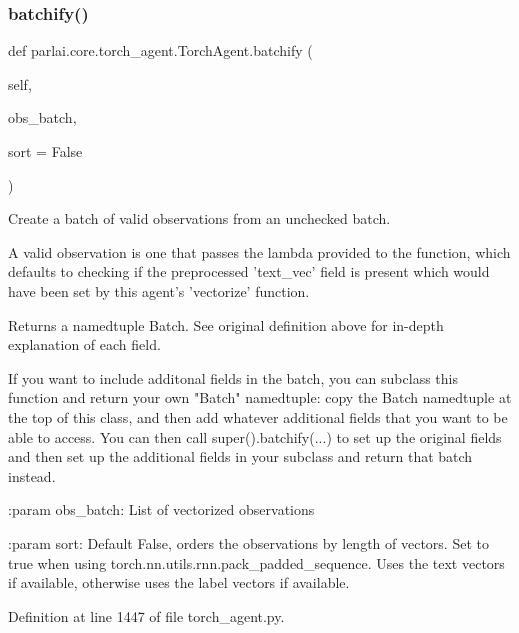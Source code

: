 \subsubsection{\texorpdfstring{batchify()}{batchify()}}
{\footnotesize\ttfamily def parlai.\+core.\+torch\+\_\+agent.\+Torch\+Agent.\+batchify (\begin{DoxyParamCaption}\item[{}]{self,  }\item[{}]{obs\+\_\+batch,  }\item[{}]{sort = {\ttfamily False} }\end{DoxyParamCaption})}

\begin{DoxyVerb}Create a batch of valid observations from an unchecked batch.

A valid observation is one that passes the lambda provided to the
function, which defaults to checking if the preprocessed 'text_vec'
field is present which would have been set by this agent's 'vectorize'
function.

Returns a namedtuple Batch. See original definition above for in-depth
explanation of each field.

If you want to include additonal fields in the batch, you can subclass
this function and return your own "Batch" namedtuple: copy the Batch
namedtuple at the top of this class, and then add whatever additional
fields that you want to be able to access. You can then call
super().batchify(...) to set up the original fields and then set up the
additional fields in your subclass and return that batch instead.

:param obs_batch:
    List of vectorized observations

:param sort:
    Default False, orders the observations by length of vectors. Set to
    true when using torch.nn.utils.rnn.pack_padded_sequence.  Uses the text
    vectors if available, otherwise uses the label vectors if available.
\end{DoxyVerb}
 

Definition at line 1447 of file torch\+\_\+agent.\+py.



